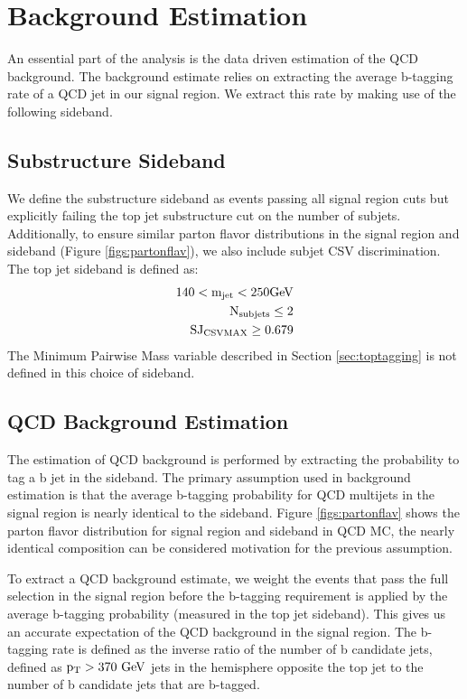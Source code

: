 \clearpage
\newpage
\section{Background Estimation}
\label{sec:backgroundEstimation}
An essential part of the analysis is the data driven estimation of the QCD background.  
The background estimate relies on extracting the average b-tagging rate of a QCD jet in our signal region.  
We extract this rate by making use of the following sideband.
\subsection{Substructure Sideband}
\label{sec:sideband}
We define the substructure sideband as events passing all signal region cuts but explicitly 
failing the top jet substructure cut on the number of subjets.  Additionally, to ensure similar parton flavor distributions in the signal region and sideband (Figure \ref{figs:partonflav}), 
we also include subjet CSV discrimination. The top jet sideband is defined as:
\begin{eqnarray}
	140  <  \mathrm{m_{jet}}  <  250 \mathrm{GeV} \\
	\mathrm{N_{subjets}}  \leq  2 \\
	\mathrm{SJ_{CSVMAX}} \geq 0.679 
\end{eqnarray}
The Minimum Pairwise Mass variable described in Section \ref{sec:toptagging} is not defined in this choice of sideband.

\subsection{QCD Background Estimation}
\label{sec:qcdBackgroundEstimationProcedure}
\label{sec:tagrateparameterization}
The estimation of QCD background is performed by extracting the probability to tag a b jet in the sideband. 
The primary assumption used in background estimation is that the average b-tagging probability 
for QCD multijets in the signal region is nearly identical to the sideband. Figure \ref{figs:partonflav}  shows the parton flavor distribution for signal region and sideband in QCD MC, the
 nearly identical composition can be considered motivation for the previous assumption.

To extract a QCD background estimate, we weight the events that pass the full selection in the signal region before the b-tagging requirement is applied by 
the average b-tagging probability (measured in the top jet sideband).  This gives us an accurate expectation of the QCD background in the signal region.
The b-tagging rate is defined as the inverse ratio of the number of b candidate jets, 
defined as $\mathrm{p_{T}} > 370~\mathrm{GeV}$ jets in the hemisphere opposite the top jet to the number of b candidate jets that are b-tagged.  

